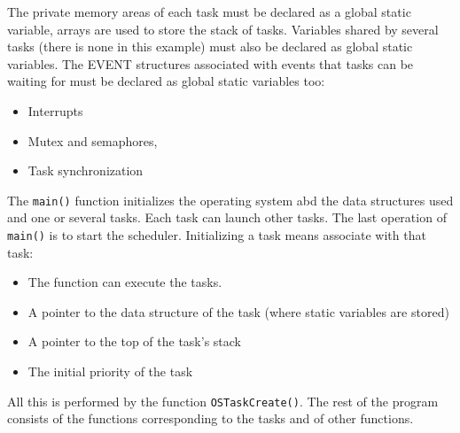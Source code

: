 
The private memory areas of each task must be declared as a global static variable, arrays are used to store the stack of tasks.
Variables shared by several tasks (there is none in this example) must also be declared as global static variables.
The EVENT structures associated with events that tasks can be waiting for must be declared as global static variables too:
\begin{itemize}
	\item Interrupts
	\item Mutex and semaphores,
	\item Task synchronization
\end{itemize}
The \texttt{main()} function initializes the operating system abd the data structures used and one or several tasks. Each task can launch other tasks. The last operation of \texttt{main()} is to start the scheduler. Initializing a task means associate with that task:
\begin{itemize}
	\item The function can execute the tasks.
	\item A pointer to the data structure of the task (where static variables are stored)
	\item A pointer to the top of the task's stack
	\item The initial priority of the task
\end{itemize}
All this is performed by the function \texttt{OSTaskCreate()}. The rest of the program consists of the functions corresponding to the tasks and of other functions.

